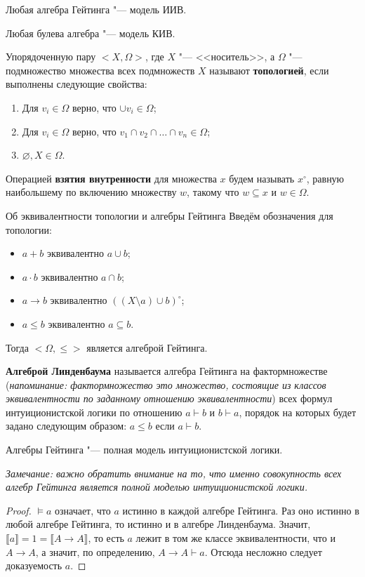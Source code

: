 \begin{theorem}
Любая алгебра Гейтинга "--- модель ИИВ.
\end{theorem}
\begin{theorem}
Любая булева алгебра "--- модель КИВ.
\end{theorem}

\noindent Упорядоченную пару $<X, \Omega>$, где $X$ "--- <<носитель>>, а $\Omega$ "--- подмножество множества всех подмножеств $X$ называют \textbf{топологией}, если выполнены следующие свойства:
\begin{enumerate}
    \item Для $v_i \in \Omega$ верно, что $\cup v_i \in \Omega$;
    \item Для $v_i \in \Omega$ верно, что $v_1 \cap v_2 \cap \ldots \cap v_n \in \Omega$;
    \item $\varnothing, X \in \Omega$.
\end{enumerate}

\noindent Операцией \textbf{взятия внутренности} для множества $x$ будем называть $x^{\circ}$, равную наибольшему по включению множеству $w$, такому что $w \subseteq x$ и $w \in \Omega$.

\begin{theorem}{Об эквивалентности топологии и алгебры Гейтинга}
Введём обозначения для топологии:
\begin{itemize}
    \item $a + b$ эквивалентно $a \cup b$;
    \item $a \cdot b$ эквивалентно $a \cap b$;
    \item $a \to b$ эквивалентно $\left( (X \setminus a) \cup b \right)^{\circ}$;
    \item $a \leq b$ эквивалентно $a \subseteq b$.
\end{itemize}

Тогда $<\Omega, \leq>$ является алгеброй Гейтинга.
\end{theorem}

\noindent\textbf{Алгеброй Линденбаума} называется алгебра Гейтинга на фактормножестве (\textit{напоминание: фактормножество это множество, состоящие из классов эквивалентности по заданному отношению эквивалентности}) всех формул интуиционистской логики по отношению $a \vdash b$ и $b \vdash a$, порядок на которых будет задано следующим образом: $a \leq b$ если $a \vdash b$.

\begin{theorem}
Алгебры Гейтинга "--- полная модель интуиционистской логики.

\textit{Замечание: важно обратить внимание на то, что именно совокупность всех алгебр Гейтинга является полной моделью интуиционистской логики.}
\end{theorem}

\begin{proof}
$\models a$ означает, что $a$ истинно в каждой алгебре Гейтинга. Раз оно истинно в любой алгебре Гейтинга, то истинно и в алгебре Линденбаума. Значит,\\ $\llbracket a \rrbracket = 1 = \llbracket A \to A \rrbracket$, то есть $a$ лежит в том же классе эквивалентности, что и $A \to A$, а значит, по определению, $A \to A \vdash a$. Отсюда несложно следует доказуемость $a$. 
\end{proof}